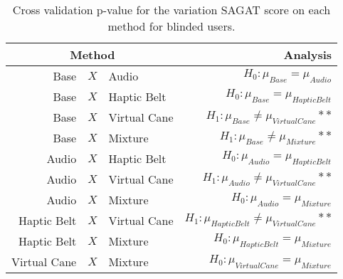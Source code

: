 
\begin{table}[!htb]
\centering
\caption{Cross validation p-value for the variation SAGAT score on each method for blinded users.}
\label{tab:lsd_sagat_var_blind}
\begin{tabular}{rclr}
\toprule
      \multicolumn{3}{c}{Method} &                                           Analysis \\
\midrule
              Base & $X$ & Audio &                   $H_0 : \mu_{Base} = \mu_{Audio}$ \\
        Base & $X$ & Haptic Belt &             $H_0 : \mu_{Base} = \mu_{Haptic Belt}$ \\
       Base & $X$ & Virtual Cane &        $H_1 : \mu_{Base} \ne \mu_{Virtual Cane}**$ \\
            Base & $X$ & Mixture &             $H_1 : \mu_{Base} \ne \mu_{Mixture}**$ \\
       Audio & $X$ & Haptic Belt &            $H_0 : \mu_{Audio} = \mu_{Haptic Belt}$ \\
      Audio & $X$ & Virtual Cane &       $H_1 : \mu_{Audio} \ne \mu_{Virtual Cane}**$ \\
           Audio & $X$ & Mixture &                $H_0 : \mu_{Audio} = \mu_{Mixture}$ \\
Haptic Belt & $X$ & Virtual Cane & $H_1 : \mu_{Haptic Belt} \ne \mu_{Virtual Cane}**$ \\
     Haptic Belt & $X$ & Mixture &          $H_0 : \mu_{Haptic Belt} = \mu_{Mixture}$ \\
    Virtual Cane & $X$ & Mixture &         $H_0 : \mu_{Virtual Cane} = \mu_{Mixture}$ \\
\bottomrule
\end{tabular}
\end{table}

